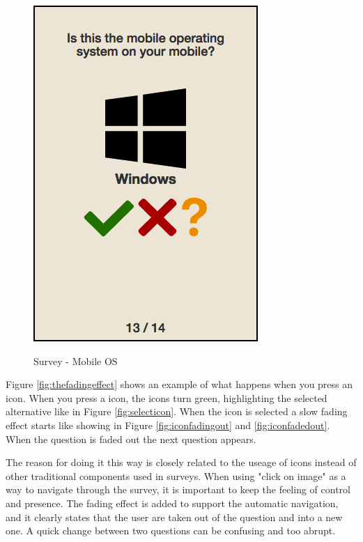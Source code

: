 \begin{figure}[H]
{        \includegraphics[scale=0.34]{pics/survey/windows}
      }
      \caption{Survey - Mobile OS}
      \label{fig:mobileOSquestion}
    \end{figure}
    \clearpage
    
    Figure \ref{fig:thefadingeffect} shows an example of what happens when you press an icon. When you press a icon, the icons turn green, highlighting the selected alternative like in Figure \ref{fig:selecticon}. When the icon is selected a slow fading effect starts like showing in Figure \ref{fig:iconfadingout} and \ref{fig:iconfadedout}. When the question is faded out the next question appears. 

    The reason for doing it this way is closely related to the useage of icons instead of other traditional components used in surveys. When using "click on image" as a way to navigate through the survey, it is important to keep the feeling of control and presence. The fading effect is added to support the automatic navigation, and it clearly states that the user are taken out of the question and into a new one. A quick change between two questions can be confusing and too abrupt.

